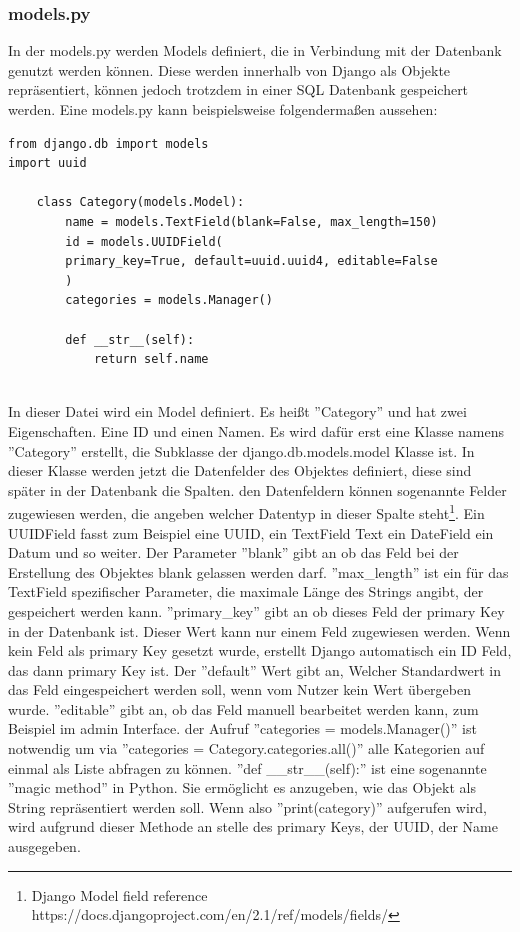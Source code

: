 \documentclass{article}
\begin{document}
\subsubsection{models.py}
In der models.py werden Models definiert, die in Verbindung mit der Datenbank genutzt werden können. Diese werden innerhalb von Django als Objekte repräsentiert, können jedoch trotzdem in einer SQL Datenbank gespeichert werden. Eine models.py kann beispielsweise folgendermaßen aussehen:
\begin{verbatim}
from django.db import models
import uuid

	class Category(models.Model):
		name = models.TextField(blank=False, max_length=150)
		id = models.UUIDField(
		primary_key=True, default=uuid.uuid4, editable=False
		)	
		categories = models.Manager()
		
		def __str__(self):
			return self.name
	
\end{verbatim}
In dieser Datei wird ein Model definiert. Es heißt ''Category'' und hat zwei Eigenschaften. Eine ID und einen Namen. Es wird dafür erst eine Klasse namens ''Category'' erstellt, die Subklasse der django.db.models.model Klasse ist. In dieser Klasse werden jetzt die Datenfelder des Objektes definiert, diese sind später in der Datenbank die Spalten. den Datenfeldern können sogenannte Felder zugewiesen werden, die angeben welcher Datentyp in dieser Spalte steht\footnote{ Django Model field reference https://docs.djangoproject.com/en/2.1/ref/models/fields/}. Ein UUIDField fasst zum Beispiel eine UUID, ein TextField Text ein DateField ein Datum und so weiter. Der Parameter ''blank'' gibt an ob das Feld bei der Erstellung des Objektes blank gelassen werden darf. ''max\_length'' ist ein für das TextField spezifischer Parameter, die maximale Länge des Strings angibt, der gespeichert werden kann. ''primary\_key'' gibt an ob dieses Feld der primary Key in der Datenbank ist. Dieser Wert kann nur einem Feld zugewiesen werden. Wenn kein Feld als primary Key gesetzt wurde, erstellt Django  automatisch ein ID Feld, das dann primary Key ist. Der ''default'' Wert gibt an, Welcher Standardwert in das Feld eingespeichert werden soll, wenn vom Nutzer kein Wert übergeben wurde. ''editable'' gibt an, ob das Feld manuell bearbeitet werden kann, zum Beispiel im admin Interface.\newline
der Aufruf ''categories = models.Manager()'' ist notwendig um via ''categories = Category.categories.all()'' alle Kategorien auf einmal als Liste abfragen zu können.\newline
''def \_\_str\_\_(self):'' ist eine sogenannte ''magic method'' in Python. Sie ermöglicht es anzugeben, wie das Objekt als String repräsentiert werden soll. Wenn also ''print(category)'' aufgerufen wird, wird aufgrund dieser Methode an stelle des primary Keys, der UUID, der Name ausgegeben.
\end{document}
